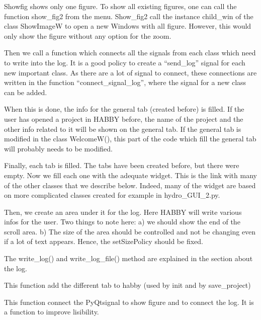 \documentclass[letterpaper,10pt,english]{sphinxmanual}
\begin{document}
\begin{fulllineitems}
Showfig shows only one figure. To show all existing figures, one can call the function show\_fig2 from the menu.
Show\_fig2 call the instance child\_win of the class ShowImageW to open a new Windows with all figure. However,
this would only show the figure without any option for the zoom.

Then we call a function which connects all the signals from each class which need to write into the log. It is a good
policy to create a “send\_log” signal for each new important class. As there are a lot of signal to connect, these
connections are written in the function “connect\_signal\_log”, where the signal for a new class can be added.

When this is done, the info for the general tab (created before) is filled. If the user has opened a project in HABBY
before, the name of the project and the other info related to it will be shown on the general tab. If the general
tab is modified in the class WelcomeW(), this part of the code which fill the general tab will probably needs to
be modified.

Finally, each tab is filled. The tabs have been created before, but there were empty. Now we fill each one with the
adequate widget. This is the link with many of the other classes that we describe below. Indeed, many of the widget
are based on more complicated classes created for example in hydro\_GUI\_2.py.

Then, we create an area under it for the log. Here HABBY will write various infos for the user. Two things to note
here: a) we should show the end of the scroll area. b) The size of the area should be controlled and not be
changing even if a lot of text appears. Hence, the setSizePolicy should be fixed.

The write\_log() and write\_log\_file() method are explained in the section about the log.

\begin{fulllineitems}
\label{\detokenize{index:src_GUI.Main_windows_1.CentralW.add_all_tab}}
This function add the different tab to habby (used by init and by save\_project)

\end{fulllineitems}


\begin{fulllineitems}
\label{\detokenize{index:src_GUI.Main_windows_1.CentralW.connect_signal_fig_and_drop}}
This function connect the PyQtsignal to show figure and to connect the log. It is a function to
improve lisibility.


\end{fulllineitems}
\end{fulllineitems}
\end{document}
